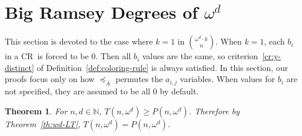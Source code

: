 \documentclass[10pt,a4paper]{article}
\newcommand{\om}{\omega}
\newcommand{\N}{\mathbb{N}}
\newcommand{\crulenospace}{CR}
\newcommand{\crule}{\crulenospace~}
\newcommand{\xleq}{\preceq_{\overline{A}}}
\newcommand{\numpoints}{n}
\newcommand{\inumpoints}{i}
\newcommand{\idegr}{j}
\newcommand{\commonconst}{a}
\newcommand{\rareconst}{b}
\theoremstyle{plain}
\newtheorem{theorem}{Theorem}[section]
\theoremstyle{definition}
\begin{document}
\section{Big Ramsey Degrees of \texorpdfstring{$\om^d$}{omega d}}\label{se:ord} 
This section is devoted to the case where $k=1$ in $\binom{\om^d \cdot k}{\numpoints}$. When $k=1$, each $\rareconst_{\inumpoints}$ in a \crule is forced to be 0. Then all $\rareconst_{\inumpoints}$ values are the same, so criterion~\ref{cr:y-distinct} of Definition~\ref{def:coloring-rule} is always satisfied. In this section, our proofs focus only on how $\xleq$ permutes the $\commonconst_{\inumpoints,\idegr}$ variables. When values for $\rareconst_{\inumpoints}$ are not specified, they are assumed to be all 0 by default.

\begin{theorem}\label{th:wd-GT}
For $\numpoints,d \in \N$, $T\left(\numpoints,\om^d\right) \geq P\left(\numpoints,\om^d\right)$. Therefore by Theorem~\ref{th:wd-LT}, $T(\numpoints,\om^d) =  P(\numpoints,\om^d)$.
\end{theorem} 
\end{document}
